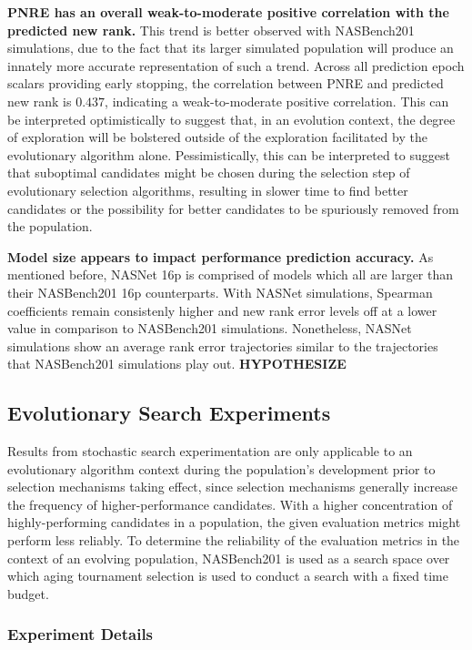 \documentclass[twocolumn]{article}
\begin{document}
\textbf{PNRE has an overall weak-to-moderate positive correlation with the predicted new rank.}
This trend is better observed with NASBench201 simulations, due to the fact that its larger simulated population will produce an innately more accurate
representation of such a trend. 
Across all prediction epoch scalars providing early stopping, the correlation between PNRE and predicted new rank is $0.437$,
indicating a weak-to-moderate positive correlation. 
This can be interpreted optimistically to suggest that, in an evolution context, the degree of exploration will be bolstered
outside of the exploration facilitated by the evolutionary algorithm alone. 
Pessimistically, this can be interpreted to suggest that suboptimal candidates might be chosen during the selection step of
evolutionary selection algorithms, resulting in slower time to find better candidates or the possibility for better candidates
to be spuriously removed from the population.

\textbf{Model size appears to impact performance prediction accuracy.} 
As mentioned before, NASNet 16p is comprised of models which all are larger than their NASBench201 16p counterparts.
With NASNet simulations, Spearman coefficients remain consistenly higher and new rank error levels off at a lower value in comparison to NASBench201 simulations.
Nonetheless, NASNet simulations show an average rank error trajectories similar to the trajectories that NASBench201 simulations play out.
\textbf{HYPOTHESIZE}

\subsection{Evolutionary Search Experiments}

Results from stochastic search experimentation are only applicable to an evolutionary algorithm context during the population's development prior to 
selection mechanisms taking effect, since selection mechanisms generally increase the frequency of higher-performance candidates. 
With a higher concentration of highly-performing candidates in a population, the given evaluation metrics might perform less reliably.
To determine the reliability of the evaluation metrics in the context of an evolving population, NASBench201 is used as a search space
over which aging tournament selection \cite{amoebanet} is used to conduct a search with a fixed time budget.

\subsubsection{Experiment Details}
\end{document}
